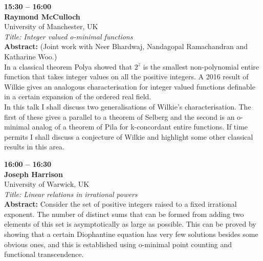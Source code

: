 \documentclass[10pt,a4paper]{article}
\begin{document}
\begin{tcolorbox}[talkbox]
\textbf{15:30 -- 16:00} \\
\textbf{Raymond McCulloch} \\
University of Manchester, UK \\
\textit{Title: Integer valued o-minimal functions} \\
\textbf{Abstract:} (Joint work with Neer Bhardwaj, Nandagopal Ramachandran and Katharine Woo.) \\
						
In a classical theorem Polya showed that $2^z$ is the smallest non-polynomial entire function that takes integer values on all the positive integers. A 2016 result of Wilkie gives an analogous characterisation for integer valued functions definable in a certain expansion of the ordered real field. \\

In this talk I shall discuss two generalisations of Wilkie's characterisation. The first of these gives a parallel to a theorem of Selberg and the second is an o-minimal analog of a theorem of Pila for k-concordant entire functions. If time permits I shall discuss a conjecture of Wilkie and highlight some other classical results in this area.
\end{tcolorbox}
\begin{tcolorbox}[talkbox]
\textbf{16:00 -- 16:30} \\
\textbf{Joseph Harrison} \\
University of Warwick, UK \\
\textit{Title: Linear relations in irrational powers} \\
\textbf{Abstract:} Consider the set of positive integers raised to a fixed irrational exponent. The number of distinct sums that can be formed from adding two elements of this set is asymptotically as large as possible. This can be proved by showing that a certain Diophantine equation has very few solutions besides some obvious ones, and this is established using o-minimal point counting and functional transcendence.
\end{tcolorbox}

\newpage

\end{document}
